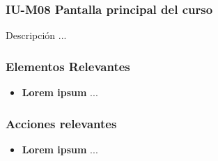 \subsubsection{IU-M08 Pantalla principal del curso}

 Descripción ...


\subsubsection{Elementos Relevantes}

    \begin{itemize}
    \item {\bf Lorem ipsum}
        ...
    \end{itemize}

\subsubsection{Acciones relevantes}

    \begin{itemize}
    \item {\bf Lorem ipsum}
        ...
    \end{itemize}

\clearpage

